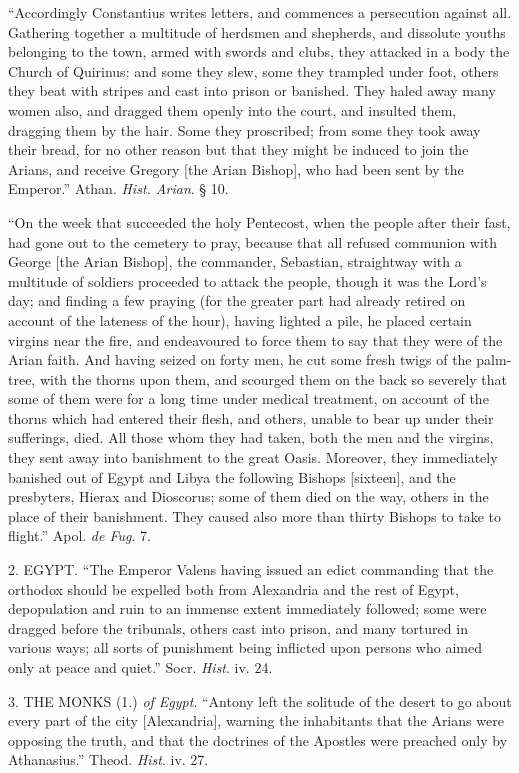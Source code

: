 ``Accordingly Constantius writes letters, and commences a
persecution against all. Gathering together a multitude of herdsmen
and shepherds, and dissolute youths belonging to the town, armed with
swords and clubs, they attacked in a body the Church of Quirinus: and
some they slew, some they trampled under foot, others they beat with
stripes and cast into prison or banished. They haled away many women
also, and dragged them openly into the court, and insulted them,
dragging them by the hair. Some they proscribed; from some they took
away their bread, for no other reason but that they might be induced
to join the Arians, and receive Gregory [the Arian Bishop], who had
been sent by the Emperor.'' Athan. \emph{Hist. Arian}. § 10.

``On the week that succeeded the holy Pentecost, when the
people after their fast, had gone out to the cemetery to pray, because
that all refused communion with George [the Arian Bishop], the
commander, Sebastian, straightway with a multitude of soldiers
proceeded to attack the people, though it was the Lord's day; and
finding a few praying (for the greater part had already retired on
account of the lateness of the hour), having lighted a pile, he placed
certain virgins near the fire, and endeavoured to force them to say
that they were of the Arian faith. And having seized on forty men, he
cut some fresh twigs of the palm-tree, with the thorns upon them, and
scourged them on the back so severely that some of them were for a
long time under medical treatment, on account of the thorns which had
entered their flesh, and others, unable to bear up under their
sufferings, died. All those whom they had taken, both the men and the
virgins, they sent away into banishment to the great Oasis. Moreover,
they immediately banished out of Egypt and Libya the following Bishops
[sixteen], and the presbyters, Hierax and Dioscorus; some of them died
on the way, others in the place of their banishment. They caused also
more than thirty Bishops to take to flight.'' Apol. \emph{de Fug}.
7.

2. EGYPT. ``The Emperor Valens having
issued an edict commanding that the orthodox should be expelled both
from Alexandria and the rest of Egypt, depopulation and ruin to an
immense extent immediately followed; some were dragged before the
tribunals, others cast into prison, and many tortured in various ways;
all sorts of punishment being inflicted upon persons who aimed only at
peace and quiet.'' Socr. \emph{Hist}. iv. 24.

3. THE MONKS (1.) \emph{of
Egypt}. ``Antony left the solitude of the desert to go about
every part of the city [Alexandria], warning the inhabitants that the
Arians were opposing the truth, and that the doctrines of the Apostles
were preached only by Athanasius.'' Theod. \emph{Hist}. iv. 27.

